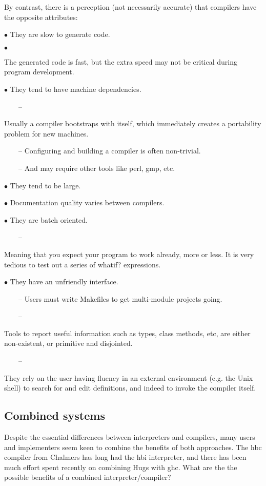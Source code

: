\documentclass[a4paper]{article}
\begin{document}
\noindent
By contrast, there is a perception (not necessarily accurate) that
compilers have the opposite attributes:

$\bullet$
    They are slow to generate code.

$\bullet$
  \parbox[t]{11cm}{
    The generated code is fast, but the extra speed may not be
      critical during program development.}

$\bullet$
    They tend to have machine dependencies.

\ \ \ \ --
      \parbox[t]{10cm}{
        Usually a compiler bootstraps with itself, which
        immediately creates a portability problem for new machines.}

\ \ \ \ --
      Configuring and building a compiler is often non-trivial.

\ \ \ \ --
      And may require other tools like perl, gmp, etc.

$\bullet$
    They tend to be large.

$\bullet$
    Documentation quality varies between compilers.

$\bullet$
    They are batch oriented.

\ \ \ \ --
      \parbox[t]{10cm}{
        Meaning that you expect your program to work already, more or less.
        It is very tedious to test out a series of whatif? expressions.}

$\bullet$
    They have an unfriendly interface.

\ \ \ \ --
      Users must write Makefiles to get multi-module projects going.

\ \ \ \ --
      \parbox[t]{10cm}{
        Tools to report useful information such as types, class methods,
        etc, are either non-existent, or primitive and disjointed.}

\ \ \ \ --
      \parbox[t]{10cm}{
        They rely on the user having fluency in an external environment
        (e.g. the Unix shell) to search for and edit definitions, and
        indeed to invoke the compiler itself.}

\subsection*{Combined systems}

Despite the essential differences between interpreters and compilers,
many users and implementers seem keen to combine the benefits of
both approaches.  The hbc compiler from Chalmers has long had the
hbi interpreter, and there has been much effort spent recently
on combining Hugs with ghc.  What are the the possible benefits of
a combined interpreter/compiler?
\end{document}
